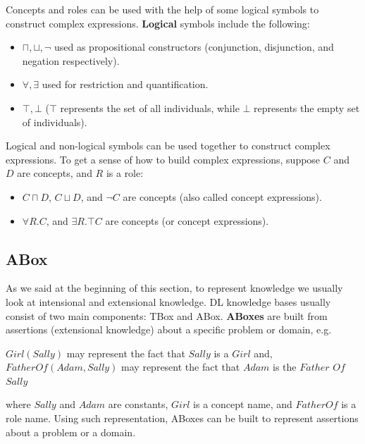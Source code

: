 Concepts and roles can be used with the help of some logical symbols to construct complex expressions. \textbf{Logical} symbols include the following:
\begin{itemize}
\item $\sqcap, \sqcup, \neg$ used as propositional constructors (conjunction, disjunction, and negation respectively).
\item $\forall, \exists$ used for restriction and quantification.
\item $\top, \bot$ ($\top$ represents the set of all individuals, while $\bot$ represents the empty set of individuals). 
\end{itemize}

Logical and non-logical symbols can be used together to construct complex expressions. To get a sense of how to build complex expressions, suppose $C$ and $D$ are concepts, and $R$ is a role:
\begin{itemize}
\item $C \sqcap D$, $C \sqcup D$, and $\neg C$ are concepts (also called concept expressions).
\item $\forall R.C$, and $\exists R.\top C$ are concepts (or concept expressions).
\end{itemize}


\subsection{ABox}
As we said at the beginning of this section, to represent knowledge we usually look at intensional and extensional knowledge. DL knowledge bases usually consist of two main components: TBox and ABox. \textbf{ABoxes} are built from assertions (extensional knowledge) about a specific problem or domain, e.g.
\begin{center}
$Girl(Sally)$ may represent the fact that $Sally$ is a $Girl$ and, \\
$FatherOf(Adam, Sally)$ may represent the fact that $Adam$ is the $Father$ $Of$ $Sally$
\end{center} 
where $Sally$ and $Adam$ are constants, $Girl$ is a concept name, and $FatherOf$ is a role name. Using such representation, ABoxes can be built to represent assertions about a problem or a domain.


